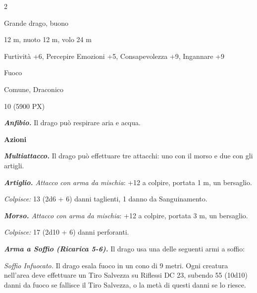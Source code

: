 \begin{multicols}{2}
{
\begin{description}[noitemsep, topsep=0pt, parsep=0pt, partopsep=0pt, itemsep=1pt, leftmargin=2.35cm,  labelwidth=2.2cm, itemindent=0cm, listparindent=0pt] %
\setlength{\baselineskip}{10pt}
\item[\textbf{Taglia/Tipo}] Grande drago, buono
\item[\textbf{Caratt.}] 
\item[\textbf{Punti Ferita}] 
\item[\textbf{Movimento}] 12 m, nuoto 12 m, volo 24 m
\item[\textbf{Tiri Salvez.}] 
\item[\textbf{Comp.}] Furtività +6, Percepire Emozioni +5, Consapevolezza +9, Ingannare +9
\item[\textbf{Imm. Danni}] Fuoco
\item[\textbf{Sensi}] 
\item[\textbf{Linguaggi}] Comune, Draconico
\item[\textbf{Sfida}] 10 (5900 PX)
\end{description}
\smallskip

\emph{\textbf{Anfibio.}} Il drago può respirare aria e acqua.

\textbf{Azioni}

\emph{\textbf{Multiattacco.}} Il drago può effettuare tre attacchi: uno con il morso e due con gli artigli.

\emph{\textbf{Artiglio.} Attacco con arma da mischia}: +12 a colpire, portata 1 m, un bersaglio.

\emph{Colpisce:} 13 (2d6 + 6) danni taglienti, 1 danno da Sanguinamento.

\emph{\textbf{Morso.} Attacco con arma da mischia}: +12 a colpire, portata 3 m, un bersaglio.

\emph{Colpisce:} 17 (2d10 + 6) danni perforanti.

\emph{\textbf{Arma a Soffio (Ricarica 5-6).}} Il drago usa una delle seguenti armi a soffio:

\emph{Soffio Infuocato.} Il drago esala fuoco in un cono di 9 metri. Ogni creatura nell'area deve effettuare un Tiro Salvezza su Riflessi DC 23, subendo 55 (10d10) danni da fuoco se fallisce il Tiro Salvezza, o la metà di questi danni se lo riesce.

}
\end{multicols}
